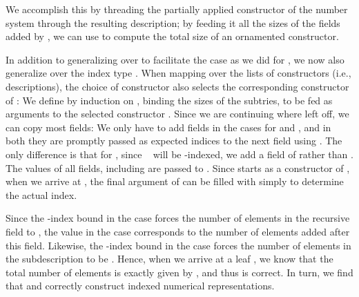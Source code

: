 We accomplish this by threading the partially applied constructor  of the number system  through the resulting description; by feeding it all the sizes of the fields added by , we can use  to compute the total size of an ornamented constructor.

In addition to generalizing over  to facilitate the  case as we did for , we now also generalize over the index type . When mapping over the lists of constructors (i.e., descriptions), the choice of constructor also selects the corresponding constructor of :
We define  by induction on , binding the sizes of the subtries, to be fed as arguments to the selected constructor . Since we are continuing where  left off, we can copy most fields:
We only have to add fields in the cases for  and , and in both they are promptly passed as expected indices to the next field using . The only difference is that for , since \  will be -indexed, we add a field of  rather than . The values of all fields, including  are passed to . Since  starts as a constructor  of , when we arrive at , the final argument of  can be filled with simply  to determine the actual index.

Since the -index  bound in the  case forces the number of elements in the recursive field to , the value in the  case corresponds to the number of elements added after this field. Likewise, the -index  bound in the  case forces the number of elements in the subdescription to be . Hence, when we arrive at a leaf , we know that the total number of elements is exactly given by , and thus  is correct. In turn, we find that  and  correctly construct indexed numerical representations.

